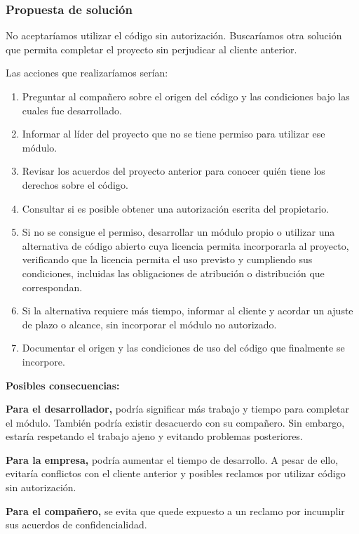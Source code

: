 \documentclass[12pt,a4paper,oneside]{article}
\newcommand{\rotulo}[1]{\par\Needspace{5\baselineskip}\noindent\textbf{#1}\par\nobreak}
\begin{document}
\subsubsection{Propuesta de solución}

No aceptaríamos utilizar el código sin autorización. Buscaríamos otra solución que permita completar el proyecto sin perjudicar al cliente anterior.

Las acciones que realizaríamos serían:

\begin{enumerate}[leftmargin=1.8em,itemsep=3pt]
    \item Preguntar al compañero sobre el origen del código y las condiciones bajo las cuales fue desarrollado.
    \item Informar al líder del proyecto que no se tiene permiso para utilizar ese módulo.
    \item Revisar los acuerdos del proyecto anterior para conocer quién tiene los derechos sobre el código.
    \item Consultar si es posible obtener una autorización escrita del propietario.
    \item Si no se consigue el permiso, desarrollar un módulo propio o utilizar una alternativa de código abierto cuya licencia permita incorporarla al proyecto, verificando que la licencia permita el uso previsto y cumpliendo sus condiciones, incluidas las obligaciones de atribución o distribución que correspondan.
    \item Si la alternativa requiere más tiempo, informar al cliente y acordar un ajuste de plazo o alcance, sin incorporar el módulo no autorizado.
    \item Documentar el origen y las condiciones de uso del código que finalmente se incorpore.
\end{enumerate}

\rotulo{Posibles consecuencias:}

\textbf{Para el desarrollador,} podría significar más trabajo y tiempo para completar el módulo. También podría existir desacuerdo con su compañero. Sin embargo, estaría respetando el trabajo ajeno y evitando problemas posteriores.

\textbf{Para la empresa,} podría aumentar el tiempo de desarrollo. A pesar de ello, evitaría conflictos con el cliente anterior y posibles reclamos por utilizar código sin autorización.

\textbf{Para el compañero,} se evita que quede expuesto a un reclamo por incumplir sus acuerdos de confidencialidad.
\end{document}
